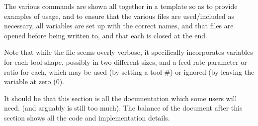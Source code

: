 \documentclass{ltxdoc}
\begin{document}
The various commands are shown all together in a template so as to provide examples of usage, 
and to ensure that the various files are used/included as necessary, all variables are set up 
with the correct names, and that files are opened before being written to, and that each
is closed at the end. 

Note that while the file seems overly verbose, it specifically incorporates variables
for each tool shape, possibly in two different sizes, and a feed rate parameter or ratio
for each, which may be used (by setting a tool \#) or ignored (by leaving the variable
at zero (0).

It should be that this section is all the documentation which some users will need.
(and arguably is still too much). The balance of the document after this section
shows all the code and implementation details.

%
%
%
%
%
\end{document}
